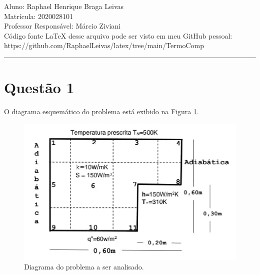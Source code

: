 \documentclass[12pt]{scrartcl}
\begin{document}



\pagestyle{fancy}

\fancyhead{}
\fancyfoot{}

\begin{center}
    Aluno: Raphael Henrique Braga Leivas \\
    Matrícula: 2020028101 \\
    Professor Responsável: Márcio Ziviani \\[20pt]

    Código fonte LaTeX desse arquivo pode ser visto em meu GitHub pessoal: https://github.com/RaphaelLeivas/latex/tree/main/TermoComp
\end{center}

\hrule

\section{Questão 1}

O diagrama esquemático do problema está exibido na Figura \ref{fig:problemaplaca}.

\begin{figure}[h!]
    \caption{Diagrama do problema a ser analisado.}
    \label{fig:problemaplaca}
    \centering
    \includegraphics[scale=0.60]{problemaED05.png}
\end{figure}
\end{document}
